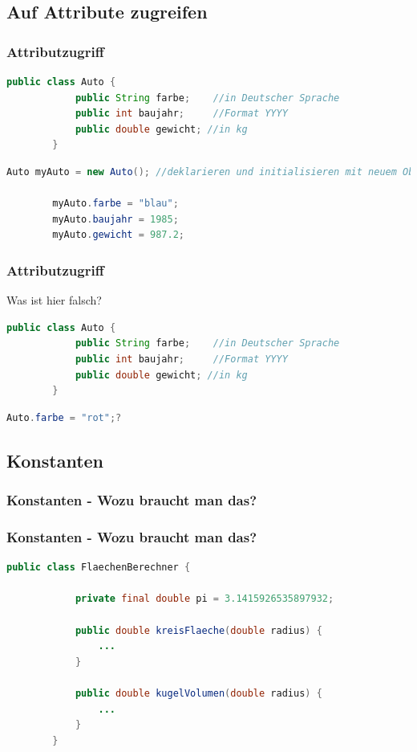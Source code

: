 \documentclass[18pt]{beamer}
\begin{document}
\subsection{Auf Attribute zugreifen}
\begin{frame}[fragile]
	\frametitle{Attributzugriff}
	
	\begin{lstlisting}[language=java]
		public class Auto {
			public String farbe;	//in Deutscher Sprache
			public int baujahr;		//Format YYYY
			public double gewicht; //in kg
		}
	\end{lstlisting}
	
	\begin{lstlisting}[language=java]
		Auto myAuto = new Auto(); //deklarieren und initialisieren mit neuem Objekt
		
		myAuto.farbe = "blau";
		myAuto.baujahr = 1985;
		myAuto.gewicht = 987.2;
	\end{lstlisting}
	
\end{frame}

\begin{frame}[fragile]
	\frametitle{Attributzugriff}
	Was ist hier falsch?
	
	
	\begin{lstlisting}[language=java]
		public class Auto {
			public String farbe;	//in Deutscher Sprache
			public int baujahr;		//Format YYYY
			public double gewicht; //in kg
		}
	\end{lstlisting}
	
	\begin{lstlisting}[language=java]
		Auto.farbe = "rot";?
	\end{lstlisting}
	
\end{frame}

\subsection{Konstanten}
\begin{frame}
	\frametitle{Konstanten - Wozu braucht man das?}
\end{frame}


\begin{frame}[fragile]
	\frametitle{Konstanten - Wozu braucht man das?}
	
	\begin{lstlisting}[language=java]
		public class FlaechenBerechner {
		
			private final double pi = 3.1415926535897932;
		
			public double kreisFlaeche(double radius) {
				...
			}
			
			public double kugelVolumen(double radius) {
				...
			}
		}
	\end{lstlisting}
\end{frame}
\end{document}
